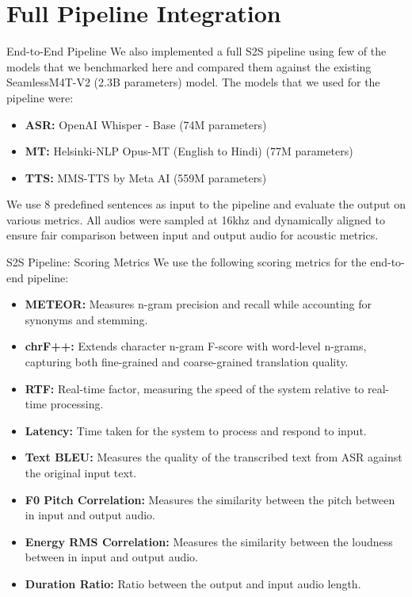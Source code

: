 \documentclass{beamer}
\begin{document}
\section{Full Pipeline Integration}

\begin{frame}{End-to-End Pipeline}
We also implemented a full S2S pipeline using few of the models that we benchmarked here and compared them against the existing SeamlessM4T-V2 (2.3B parameters) model. The models that we used for the pipeline were:
\begin{itemize}
\item \textbf{ASR:} OpenAI Whisper - Base (74M parameters)
\item \textbf{MT:} Helsinki-NLP Opus-MT (English to Hindi) (77M parameters)
\item \textbf{TTS:} MMS-TTS by Meta AI (559M parameters)
\end{itemize}

We use 8 predefined sentences as input to the pipeline and evaluate the output on various metrics. All audios were sampled at 16khz and dynamically aligned to ensure fair comparison between input and output audio for acoustic metrics.
\end{frame}

\begin{frame}{S2S Pipeline: Scoring Metrics}
We use the following scoring metrics for the end-to-end pipeline:
\begin{itemize}
\item \textbf{METEOR:} Measures n-gram precision and recall while accounting for synonyms and stemming.
\item \textbf{chrF++:} Extends character n-gram F-score with word-level n-grams, capturing both fine-grained and coarse-grained translation quality.
\item \textbf{RTF:} Real-time factor, measuring the speed of the system relative to real-time processing.
\item \textbf{Latency:} Time taken for the system to process and respond to input.
\item \textbf{Text BLEU:} Measures the quality of the transcribed text from ASR against the original input text.
\item \textbf{F0 Pitch Correlation:} Measures the similarity between the pitch between in input and output audio.
\item \textbf{Energy RMS Correlation:} Measures the similarity between the loudness between in input and output audio.
\item \textbf{Duration Ratio:} Ratio between the output and input audio length.
\end{itemize}
\end{frame}
\end{document}

